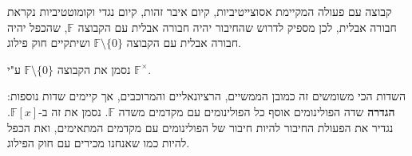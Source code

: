 \documentclass{tstextbook}
\begin{document}
\begin{remark}
קבוצה עם פעולה המקיימת אסוצייטיביות, קיום איבר זהות, קיום נגדי וקומוטטיביות נקראת חבורה אבלית, לכן מספיק לדרוש שהחיבור יהיה חבורה אבלית עם הקבוצה \(\mathbb{F}\), שהכפל יהיה חבורה אבלית עם הקבוצה \(\mathbb{F} \setminus \{ 0 \}\) ושיתקיים חוק פילוג.

\end{remark}
\begin{symbolize}
נסמן את הקבוצה \(\mathbb{F} \setminus \{ 0 \}\) ע"י \(\mathbb{F} ^{\times}\).

\end{symbolize}
השדות הכי משומשים זה כמובן הממשיים, הרציונאליים והמרוכבים, אך קיימים שדות נוספות:
\textbf{הגדרה} שדה הפולינומים
אוסף כל הפולינומים עם מקדמים משדה \(\mathbb{F}\). נסמן את זה ב-\(\mathbb{F} [x]\). נגדיר את הפעולת החיבור להיות חיבור של הפולינומים עם מקדמים המתאימים, ואת הכפל להיות כמו שאנחנו מכירים עם חוק הפילוג. 
\end{document}
